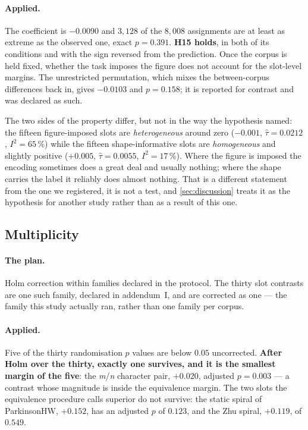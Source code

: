 \paragraph{Applied.} The coefficient is $-0.0090$ and $3{,}128$ of the $8{,}008$ assignments are at
least as extreme as the observed one, exact $p = 0.391$. \textbf{H15 holds}, in both of its
conditions and with the sign reversed from the prediction. Once the corpus is held fixed, whether
the task imposes the figure does not account for the slot-level margins. The unrestricted
permutation, which mixes the between-corpus differences back in, gives $-0.0103$ and $p = 0.158$;
it is reported for contrast and was declared as such.

The two sides of the property differ, but not in the way the hypothesis named: the fifteen
figure-imposed slots are \emph{heterogeneous} around zero ($-0.001$, $\hat\tau = 0.0212$,
$I^2 = 65\,\%$) while the fifteen shape-informative slots are \emph{homogeneous} and slightly
positive ($+0.005$, $\hat\tau = 0.0055$, $I^2 = 17\,\%$). Where the figure is imposed the encoding
sometimes does a great deal and usually nothing; where the shape carries the label it reliably does
almost nothing. That is a different statement from the one we registered, it is not a test, and
\cref{sec:discussion} treats it as the hypothesis for another study rather than as a result of this
one.

\subsection{Multiplicity}
\label{sec:stats-multiplicity}

\paragraph{The plan.} Holm correction \citep{holm1979} within families declared in the protocol.
The thirty slot contrasts are one such family, declared in addendum~I, and are corrected as one ---
the family this study actually ran, rather than one family per corpus.

\paragraph{Applied.} Five of the thirty randomisation $p$ values are below $0.05$ uncorrected.
\textbf{After Holm over the thirty, exactly one survives, and it is the smallest margin of the
five}: the \textit{m}/\textit{n} character pair, $+0.020$, adjusted $p = 0.003$ --- a contrast whose
magnitude is inside the equivalence margin. The two slots the equivalence procedure calls superior
do not survive: the static spiral of ParkinsonHW, $+0.152$, has an adjusted $p$ of $0.123$, and the
Zhu spiral, $+0.119$, of $0.549$.

